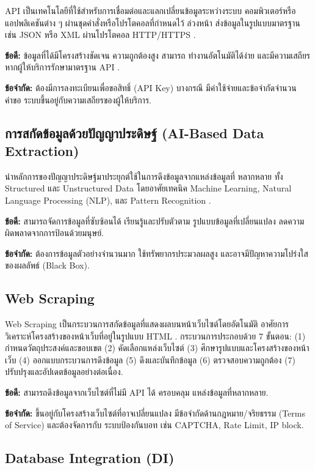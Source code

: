 API เป็นเทคโนโลยีที่ใช้สำหรับการเชื่อมต่อและแลกเปลี่ยนข้อมูลระหว่างระบบ
คอมพิวเตอร์หรือแอปพลิเคชันต่าง ๆ ผ่านชุดคำสั่งหรือโปรโตคอลที่กำหนดไว้
ล่วงหน้า ส่งข้อมูลในรูปแบบมาตรฐาน เช่น JSON หรือ XML ผ่านโปรโตคอล
HTTP/HTTPS \cite{nextjs2025}.

\textbf{ข้อดี:} ข้อมูลที่ได้มีโครงสร้างชัดเจน ความถูกต้องสูง สามารถ
ทำงานอัตโนมัติได้ง่าย และมีความเสถียรหากผู้ให้บริการรักษามาตรฐาน API
\cite{cloudflare2025}.

\textbf{ข้อจำกัด:} ต้องมีการลงทะเบียนเพื่อขอสิทธิ์ (API Key) บางกรณี
มีค่าใช้จ่ายและข้อจำกัดจำนวนคำขอ ระบบขึ้นอยู่กับความเสถียรของผู้ให้บริการ.

\subsection{การสกัดข้อมูลด้วยปัญญาประดิษฐ์ (AI-Based Data Extraction)}

นำหลักการของปัญญาประดิษฐ์มาประยุกต์ใช้ในการดึงข้อมูลจากแหล่งข้อมูลที่
หลากหลาย ทั้ง Structured และ Unstructured Data โดยอาศัยเทคนิค Machine
Learning, Natural Language Processing (NLP), และ Pattern Recognition
\cite{chunyaem2019}.

\textbf{ข้อดี:} สามารถจัดการข้อมูลที่ซับซ้อนได้ เรียนรู้และปรับตัวตาม
รูปแบบข้อมูลที่เปลี่ยนแปลง ลดความผิดพลาดจากการป้อนด้วยมนุษย์.

\textbf{ข้อจำกัด:} ต้องการข้อมูลตัวอย่างจำนวนมาก ใช้ทรัพยากรประมวลผลสูง
และอาจมีปัญหาความโปร่งใสของผลลัพธ์ (Black Box).

\subsection{Web Scraping}

Web Scraping เป็นกระบวนการสกัดข้อมูลที่แสดงผลบนหน้าเว็บไซต์โดยอัตโนมัติ
อาศัยการวิเคราะห์โครงสร้างของหน้าเว็บที่อยู่ในรูปแบบ HTML
\cite{rao2015}. กระบวนการประกอบด้วย 7 ขั้นตอน:
(1) กำหนดวัตถุประสงค์และขอบเขต
(2) คัดเลือกแหล่งเว็บไซต์
(3) ศึกษารูปแบบและโครงสร้างของหน้าเว็บ
(4) ออกแบบกระบวนการดึงข้อมูล
(5) ดึงและบันทึกข้อมูล
(6) ตรวจสอบความถูกต้อง
(7) ปรับปรุงและอัปเดตข้อมูลอย่างต่อเนื่อง.

\textbf{ข้อดี:} สามารถดึงข้อมูลจากเว็บไซต์ที่ไม่มี API ได้ ครอบคลุม
แหล่งข้อมูลที่หลากหลาย.

\textbf{ข้อจำกัด:} ขึ้นอยู่กับโครงสร้างเว็บไซต์ที่อาจเปลี่ยนแปลง
มีข้อจำกัดด้านกฎหมาย/จริยธรรม (Terms of Service) และต้องจัดการกับ
ระบบป้องกันบอท เช่น CAPTCHA, Rate Limit, IP block.

\subsection{Database Integration (DI)}

